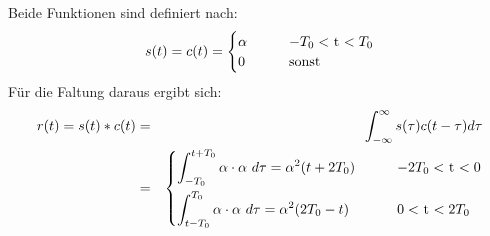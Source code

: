 Beide Funktionen sind definiert nach:\\
\begin{equation*}
s(t) = c(t) = \begin{cases} \alpha &\text{\qquad $-T_0 <$ t $< T_0$}\\
						0 &\text{\qquad sonst}
						\end{cases}
\end{equation*}
Für die Faltung daraus ergibt sich:\\
\begin{eqnarray*}
r(t) = s(t) \ast c(t) &=&  \int_{-\infty}^\infty s( \tau) c(t - \tau )  d \tau \\
&=&  \begin{cases} \displaystyle \int_{-T_0}^{t+T_0} \alpha \cdot \alpha ~d \tau = \alpha^2(t+2T_0)		&\text{\qquad $-2T_0 <$ t $< 0$}\\[1em]
					\displaystyle \int_{t-T_0}^{T_0} \alpha \cdot \alpha ~d \tau = \alpha^2(2T_0-t)		&\text{\qquad $0 <$ t $< 2T_0$}
	\end{cases}\\
\end{eqnarray*}\\~
\flushleft
